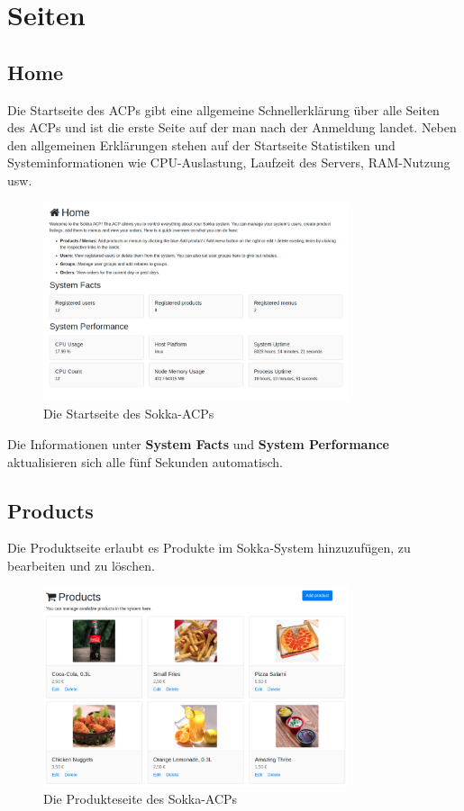 \chapter{Seiten}

\section{Home}

Die Startseite des ACPs gibt eine allgemeine Schnellerklärung über alle Seiten des ACPs und ist die erste Seite auf der man nach der Anmeldung landet. Neben den allgemeinen Erklärungen stehen auf der Startseite Statistiken und Systeminformationen wie CPU-Auslastung, Laufzeit des Servers, RAM-Nutzung usw.

\begin{figure}[ht]
    \centering
    \includegraphics[width=0.8\textwidth]{images/ACP/home.png}
    \caption{Die Startseite des Sokka-ACPs}
\end{figure}

Die Informationen unter \textbf{System Facts} und \textbf{System Performance} aktualisieren sich alle fünf Sekunden automatisch.

\section{Products}

Die Produktseite erlaubt es Produkte im Sokka-System hinzuzufügen, zu bearbeiten und zu löschen.

\begin{figure}[ht]
    \centering
    \includegraphics[width=0.8\textwidth]{images/ACP/products.png}
    \caption{Die Produkteseite des Sokka-ACPs}
\end{figure}

